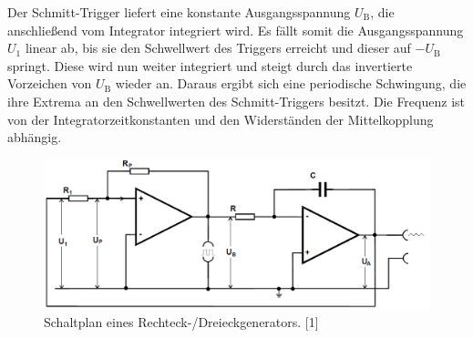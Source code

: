 \documentclass[]{scrartcl}
\begin{document}
Der Schmitt-Trigger liefert eine konstante Ausgangsspannung $U_\text{B}$, die anschließend vom Integrator integriert wird. Es fällt somit die Ausgangsspannung $U_1$ linear ab, bis sie den Schwellwert des Triggers erreicht und dieser auf $-U_\text{B}$ springt. Diese wird nun weiter integriert und steigt durch das invertierte Vorzeichen von $U_\text{B}$ wieder an.
Daraus ergibt sich eine periodische Schwingung, die ihre Extrema an den Schwellwerten des Schmitt-Triggers besitzt. Die Frequenz ist von der Integratorzeitkonstanten und den Widerständen der Mittelkopplung abhängig.
\begin{figure}[H]
\centering
\includegraphics[width=13.0cm]{images/schaltplan_generator.png}
\caption{Schaltplan eines Rechteck-/Dreieckgenerators. [1]}
\label{fig:schalplan_generator}
\end{figure}
\end{document}
